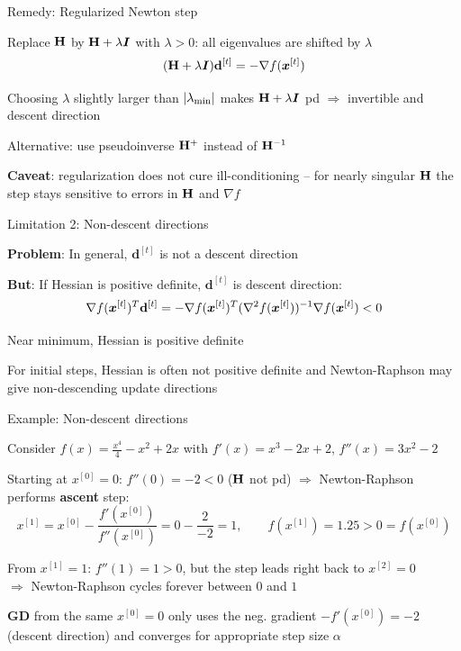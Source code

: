 \documentclass[11pt,compress,t,notes=noshow, xcolor=table]{beamer}
\begin{document}
\begin{framei}[sep=L]{Remedy: Regularized Newton step}
\item Replace $\mathbf{H}$ by $\mathbf{H} + \lambda \bm{I}$ with $\lambda > 0$: all eigenvalues are shifted by $\lambda$
$$
(\mathbf{H} + \lambda \bm{I}) \mathbf{d}^{[t]} = - \nabla f(\bm{x}^{[t]})
$$
\item Choosing $\lambda$ slightly larger than $|\lambda_\text{min}|$ makes $\mathbf{H} + \lambda \bm{I}$ pd
$\Rightarrow$ invertible and descent direction
\item Alternative: use pseudoinverse $\mathbf{H}^+$ instead of $\mathbf{H}^{-1}$
\item \textbf{Caveat}: regularization does not cure ill-conditioning -- for nearly singular $\mathbf{H}$ the step
stays sensitive to errors in $\mathbf{H}$ and $\nabla f$
\end{framei}


\begin{framei}[sep=L]{Limitation 2: Non-descent directions}
\item \textbf{Problem}: In general, $\mathbf{d}^{[t]}$ is not a descent direction
\item \textbf{But}: If Hessian is positive definite, $\mathbf{d}^{[t]}$ is descent direction:
$$
\nabla f(\bm{x}^{[t]})^T \mathbf{d}^{[t]} = - \nabla f(\bm{x}^{[t]})^T (\nabla^2 f(\bm{x}^{[t]}))^{-1} \nabla f(\bm{x}^{[t]}) < 0
$$
\item Near minimum, Hessian is positive definite
\item For initial steps, Hessian is often not positive definite and Newton-Raphson may give non-descending update directions
\end{framei}


\begin{framei}[fs=small]{Example: Non-descent directions}
\item Consider $f(x) = \frac{x^4}{4} - x^2 + 2x$ with $f'(x) = x^3 - 2x + 2$, $f''(x) = 3x^2 - 2$
\item Starting at $x^{[0]} = 0$: $f''(0) = -2 < 0$ ($\mathbf{H}$ not pd) $\Rightarrow$ Newton-Raphson performs \textbf{ascent} step:
$$
x^{[1]} = x^{[0]} - \frac{f'(x^{[0]})}{f''(x^{[0]})} = 0 - \frac{2}{-2} = 1, \qquad f(x^{[1]}) = 1.25 > 0 = f(x^{[0]})
$$
\item From $x^{[1]} = 1$: $f''(1) = 1 > 0$, but the step leads right back to $x^{[2]} = 0$ \\
$\Rightarrow$ Newton-Raphson cycles forever between $0$ and $1$
\item \textbf{GD} from the same $x^{[0]} = 0$ only uses the neg. gradient $-f'(x^{[0]})=-2$ (descent direction) and converges for appropriate step size $\alpha$
\end{framei}
\end{document}

